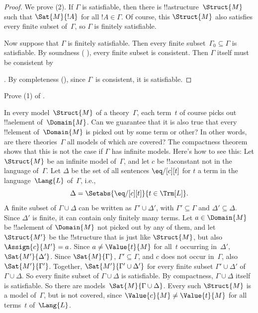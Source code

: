\begin{proof}
We prove (2).  If $\Gamma$ is satisfiable, then there is
!!a{structure}~$\Struct{M}$
such that $\Sat{M}{!A}$ for all $!A \in
\Gamma$.  Of course, this $\Struct{M}$ also
satisfies every finite subset of~$\Gamma$, so $\Gamma$ is finitely
satisfiable.

Now suppose that $\Gamma$ is finitely satisfiable.  Then every finite
subset~$\Gamma_0 \subseteq \Gamma$ is satisfiable.  By soundness
(
  ),
every finite subset is consistent.  Then $\Gamma$ itself must be
consistent by

  .
By completeness (), since $\Gamma$~is
consistent, it is satisfiable.
\end{proof}


\begin{prob}
Prove (1) of .
\end{prob}





\begin{ex}
In every model~$\Struct{M}$ of a theory~$\Gamma$, each term~$t$ of
course picks out !!a{element} of~$\Domain{M}$. Can we guarantee that
it is also true that every !!{element} of~$\Domain{M}$ is picked out
by some term or other? In other words, are there theories~$\Gamma$ all
models of which are covered?  The compactness theorem shows that this
is not the case if $\Gamma$ has infinite models. Here's how to see
this: Let $\Struct{M}$ be an infinite model of~$\Gamma$, and let $c$
be !!a{constant} not in the language of~$\Gamma$. Let $\Delta$ be the
set of all sentences $\eq/[c][t]$ for $t$ a term in the
language~$\Lang{L}$ of~$\Gamma$, i.e.,
  \[
  \Delta = \Setabs{\eq/[c][t]}{t \in \Trm[L]}.
  \]
A finite subset of $\Gamma \cup \Delta$ can be written as $\Gamma'
\cup \Delta'$, with $\Gamma' \subseteq \Gamma$ and $\Delta' \subseteq
\Delta$. Since $\Delta'$ is finite, it can contain only finitely many
terms. Let $a \in \Domain{M}$ be !!a{element} of $\Domain{M}$ not
picked out by any of them, and let $\Struct{M'}$ be the !!{structure}
that is just like $\Struct{M}$, but also $\Assign{c}{M'} = a$. Since
$a \neq \Value{t}{M}$ for all~$t$ occurring in~$\Delta'$,
$\Sat{M'}{\Delta'}$. Since $\Sat{M}{\Gamma}$, $\Gamma' \subseteq
\Gamma$, and $c$ does not occur in~$\Gamma$, also
$\Sat{M'}{\Gamma'}$. Together, $\Sat{M'}{\Gamma' \cup \Delta'}$ for
every finite subset $\Gamma' \cup \Delta'$ of $\Gamma \cup \Delta$. So
every finite subset of $\Gamma \cup \Delta$ is satisfiable. By
compactness, $\Gamma \cup \Delta$ itself is satisfiable. So there are
models~$\Sat{M}{\Gamma \cup \Delta}$. Every such $\Struct{M}$ is a
model of~$\Gamma$, but is not covered, since $\Value{c}{M} \neq
\Value{t}{M}$ for all terms~$t$ of~$\Lang{L}$.
\end{ex}

